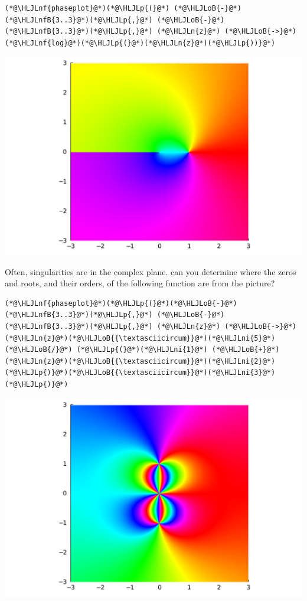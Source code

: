 \documentclass[12pt,a4paper]{article}
\newcommand{\HLJLn}[1]{#1}
\newcommand{\HLJLnf}[1]{\textcolor[RGB]{66,102,213}{#1}}
\newcommand{\HLJLnfB}[1]{\textcolor[RGB]{59,151,46}{#1}}
\newcommand{\HLJLni}[1]{\textcolor[RGB]{59,151,46}{#1}}
\newcommand{\HLJLoB}[1]{\textcolor[RGB]{102,102,102}{\textbf{#1}}}
\newcommand{\HLJLp}[1]{#1}
\begin{document}
\begin{lstlisting}
(*@\HLJLnf{phaseplot}@*)(*@\HLJLp{(}@*) (*@\HLJLoB{-}@*)(*@\HLJLnfB{3..3}@*)(*@\HLJLp{,}@*) (*@\HLJLoB{-}@*)(*@\HLJLnfB{3..3}@*)(*@\HLJLp{,}@*) (*@\HLJLn{z}@*) (*@\HLJLoB{->}@*) (*@\HLJLnf{log}@*)(*@\HLJLp{(}@*)(*@\HLJLn{z}@*)(*@\HLJLp{))}@*)
\end{lstlisting}

\includegraphics[width=\linewidth]{jl_z7eR69/Lecture1_12_1.pdf}

Often, singularities are in the complex plane. can you determine where the zeros and roots, and their orders, of the following function are from the picture?


\begin{lstlisting}
(*@\HLJLnf{phaseplot}@*)(*@\HLJLp{(}@*)(*@\HLJLoB{-}@*)(*@\HLJLnfB{3..3}@*)(*@\HLJLp{,}@*) (*@\HLJLoB{-}@*)(*@\HLJLnfB{3..3}@*)(*@\HLJLp{,}@*) (*@\HLJLn{z}@*) (*@\HLJLoB{->}@*) (*@\HLJLn{z}@*)(*@\HLJLoB{{\textasciicircum}}@*)(*@\HLJLni{5}@*)  (*@\HLJLoB{/}@*) (*@\HLJLp{(}@*)(*@\HLJLni{1}@*) (*@\HLJLoB{+}@*) (*@\HLJLn{z}@*)(*@\HLJLoB{{\textasciicircum}}@*)(*@\HLJLni{2}@*)(*@\HLJLp{)}@*)(*@\HLJLoB{{\textasciicircum}}@*)(*@\HLJLni{3}@*)(*@\HLJLp{)}@*)
\end{lstlisting}

\includegraphics[width=\linewidth]{jl_z7eR69/Lecture1_13_1.pdf}
\end{document}
